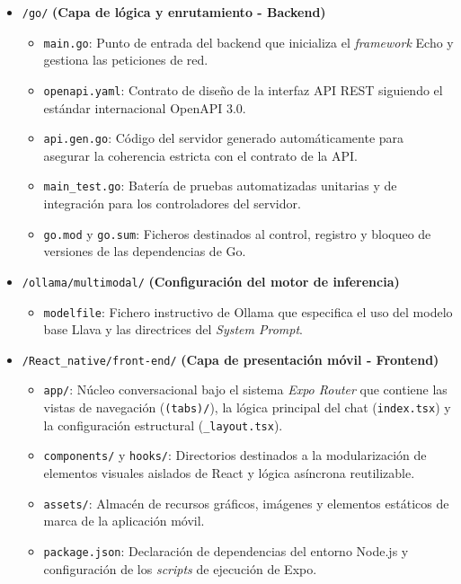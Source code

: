 \begin{itemize}
    \item \texttt{/go/} \textbf{(Capa de lógica y enrutamiento - Backend)}
    \begin{itemize}
        \item \texttt{main.go}: Punto de entrada del backend que inicializa el \textit{framework} Echo y gestiona las peticiones de red.
        \item \texttt{openapi.yaml}: Contrato de diseño de la interfaz API REST siguiendo el estándar internacional OpenAPI 3.0.
        \item \texttt{api.gen.go}: Código del servidor generado automáticamente para asegurar la coherencia estricta con el contrato de la API.
        \item \texttt{main\_test.go}: Batería de pruebas automatizadas unitarias y de integración para los controladores del servidor.
        \item \texttt{go.mod} y \texttt{go.sum}: Ficheros destinados al control, registro y bloqueo de versiones de las dependencias de Go.
    \end{itemize}
    
    \item \texttt{/ollama/multimodal/} \textbf{(Configuración del motor de inferencia)}
    \begin{itemize}
        \item \texttt{modelfile}: Fichero instructivo de Ollama que especifica el uso del modelo base Llava y las directrices del \textit{System Prompt}.
    \end{itemize}
    
    \item \texttt{/React\_native/front-end/} \textbf{(Capa de presentación móvil - Frontend)}
    \begin{itemize}
        \item \texttt{app/}: Núcleo conversacional bajo el sistema \textit{Expo Router} que contiene las vistas de navegación (\texttt{(tabs)/}), la lógica principal del chat (\texttt{index.tsx}) y la configuración estructural (\texttt{\_layout.tsx}).
        \item \texttt{components/} y \texttt{hooks/}: Directorios destinados a la modularización de elementos visuales aislados de React y lógica asíncrona reutilizable.
        \item \texttt{assets/}: Almacén de recursos gráficos, imágenes y elementos estáticos de marca de la aplicación móvil.
        \item \texttt{package.json}: Declaración de dependencias del entorno Node.js y configuración de los \textit{scripts} de ejecución de Expo.
    \end{itemize}
\end{itemize}

